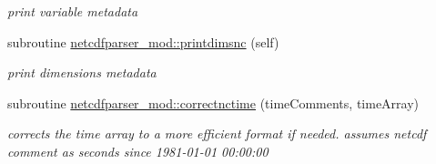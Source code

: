 \begin{DoxyCompactItemize}
\begin{DoxyCompactList}\small\item\em print variable metadata \end{DoxyCompactList}\item 
subroutine \mbox{\hyperlink{namespacenetcdfparser__mod_ac01c000a97d23613684155708249ce89}{netcdfparser\+\_\+mod\+::printdimsnc}} (self)
\begin{DoxyCompactList}\small\item\em print dimensions metadata \end{DoxyCompactList}\item 
subroutine \mbox{\hyperlink{namespacenetcdfparser__mod_af93319fde6cf6baedb7fe27bf3396e7b}{netcdfparser\+\_\+mod\+::correctnctime}} (time\+Comments, time\+Array)
\begin{DoxyCompactList}\small\item\em corrects the time array to a more efficient format if needed. assumes netcdf comment as \textquotesingle{}seconds since 1981-\/01-\/01 00\+:00\+:00\textquotesingle{} \end{DoxyCompactList}\end{DoxyCompactItemize}
